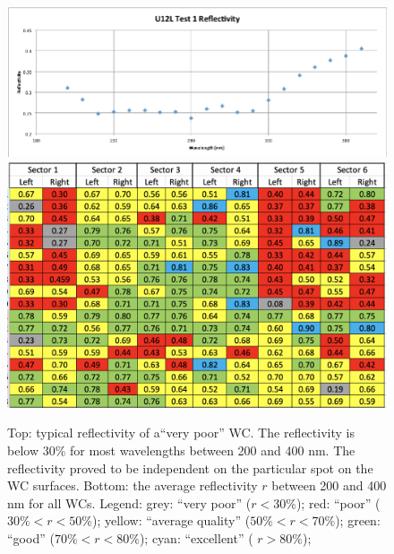 \begin{figure}[h]
	\centering
	\includegraphics[width=0.95\columnwidth,keepaspectratio]{img/winstoConeSample2Reflectivity.png}
	\includegraphics[width=0.95\columnwidth,keepaspectratio]{img/wcStatusBefore.png}
	\caption{Top: typical reflectivity of a``very poor'' WC. The reflectivity is below 30\% for most wavelengths between 200 and 400 nm. The reflectivity proved to be independent on the
				particular spot on the WC surfaces.
            Bottom: the average reflectivity $r$ between 200 and 400 nm for all WCs. Legend: grey: ``very poor'' ($r < 30\%$);
            red: ``poor'' ($30\% < r < 50\%$); yellow: ``average quality'' ($50\% < r < 70\%$); green: ``good'' ($70\% < r < 80\%$); cyan: ``excellent'' ( $r > 80\%$); }
	\label{fig:wcStatusBefore}
\end{figure}


